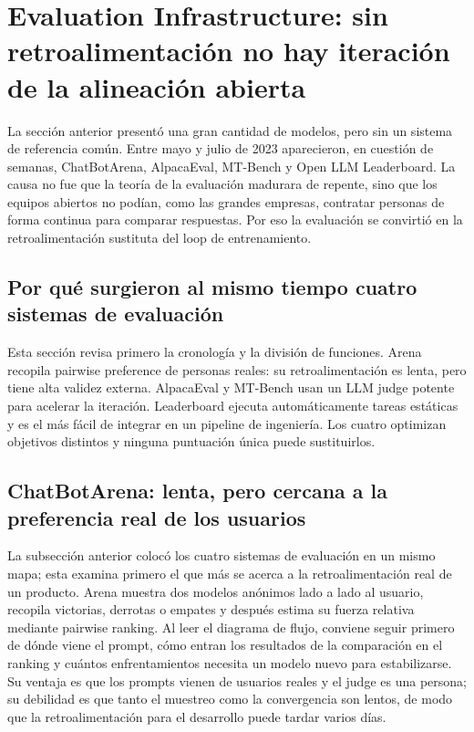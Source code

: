 \section{Evaluation Infrastructure: sin retroalimentación no hay iteración de la alineación abierta}

La sección anterior presentó una gran cantidad de modelos, pero sin un sistema de referencia común. Entre mayo y julio de 2023 aparecieron, en cuestión de semanas, ChatBotArena, AlpacaEval, MT-Bench y Open LLM Leaderboard. La causa no fue que la teoría de la evaluación madurara de repente, sino que los equipos abiertos no podían, como las grandes empresas, contratar personas de forma continua para comparar respuestas. Por eso la evaluación se convirtió en la retroalimentación sustituta del loop de entrenamiento.

\subsection{Por qué surgieron al mismo tiempo cuatro sistemas de evaluación}

Esta sección revisa primero la cronología y la división de funciones. Arena recopila pairwise preference de personas reales: su retroalimentación es lenta, pero tiene alta validez externa. AlpacaEval y MT-Bench usan un LLM judge potente para acelerar la iteración. Leaderboard ejecuta automáticamente tareas estáticas y es el más fácil de integrar en un pipeline de ingeniería. Los cuatro optimizan objetivos distintos y ninguna puntuación única puede sustituirlos.



\subsection{ChatBotArena: lenta, pero cercana a la preferencia real de los usuarios}

La subsección anterior colocó los cuatro sistemas de evaluación en un mismo mapa; esta examina primero el que más se acerca a la retroalimentación real de un producto. Arena muestra dos modelos anónimos lado a lado al usuario, recopila victorias, derrotas o empates y después estima su fuerza relativa mediante pairwise ranking. Al leer el diagrama de flujo, conviene seguir primero de dónde viene el prompt, cómo entran los resultados de la comparación en el ranking y cuántos enfrentamientos necesita un modelo nuevo para estabilizarse. Su ventaja es que los prompts vienen de usuarios reales y el judge es una persona; su debilidad es que tanto el muestreo como la convergencia son lentos, de modo que la retroalimentación para el desarrollo puede tardar varios días.

